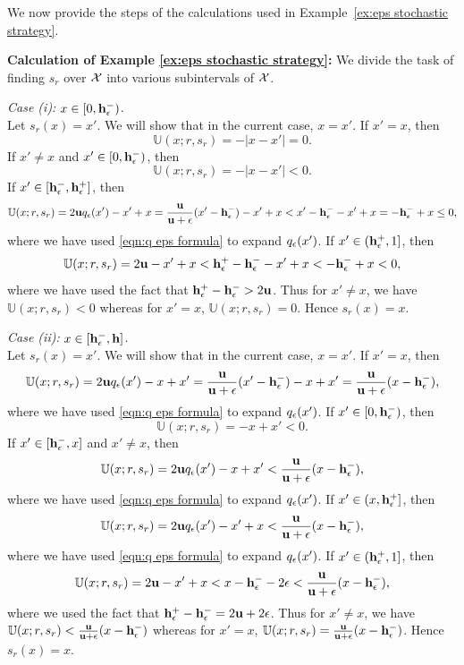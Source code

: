We now provide the steps of the calculations used in Example~\ref{ex:eps stochastic strategy}.

\noindent \textbf{Calculation of Example \ref{ex:eps stochastic strategy}:} \label{cal:eps stochastic strategy}
 We divide the task of finding $ s_r $ over $ \mathcal{X} $ into various subintervals of $ \mathcal{X} $.

\noindent \textit{Case (i):} $ x \in [0,\mathbf{h}_{\epsilon}^-) $.\\
    Let $s_r(x) = x'$. We will show that in the current case, $x=x'$.   
    If $x' = x$, then $$\mathbb{U}(x;r,s_r) = -|x-x'| = 0.$$ 
    If $x' \neq x$ and $x' \in [0,\mathbf{h}_{\epsilon}^-)$, then $$\mathbb{U}(x;r,s_r) = -|x-x'| < 0.$$
    If $x' \in [\mathbf{h}_{\epsilon}^-,\mathbf{h}_{\epsilon}^+]$, then $$\mathbb{U}(x;r,s_r) = 2\mathbf{u} q_{\epsilon}(x') - x' + x = \frac{\mathbf{u}}{\mathbf{u} + \epsilon}(x' - \mathbf{h}_{\epsilon}^-) - x' + x < x' - \mathbf{h}_{\epsilon}^- -x' + x = -\mathbf{h}_{\epsilon}^- + x \leq 0,$$ where we have used \eqref{eqn:q eps formula} to expand $q_{\epsilon}(x')$.
    If $x' \in (\mathbf{h}_{\epsilon}^+,1]$, then $$\mathbb{U}(x;r,s_r) = 2\mathbf{u} - x' + x < \mathbf{h}_{\epsilon}^+ - \mathbf{h}_{\epsilon}^- - x' + x < -\mathbf{h}_{\epsilon}^-  + x < 0,$$ where we have used the fact that $\mathbf{h}_{\epsilon}^+ - \mathbf{h}_{\epsilon}^- > 2\mathbf{u}$.
Thus for $x' \neq x$, we have $\mathbb{U}(x;r,s_r) < 0$ whereas for $x' = x$, $\mathbb{U}(x;r,s_r) = 0$. Hence $s_r(x) = x$. 
        


\noindent \textit{Case (ii):} $ x \in [\mathbf{h}_{\epsilon}^-,\mathbf{h}] $.\\
Let $s_r(x) = x'$. We will show that in the current case, $x=x'$. If $x'=x$, then 
\[\mathbb{U}(x;r,s_r) = 2\mathbf{u} q_{\epsilon}(x') - x + x' = \frac{\mathbf{u}}{\mathbf{u}+\epsilon}(x'-\mathbf{h}_{\epsilon}^-) -x +x' = \frac{\mathbf{u}}{\mathbf{u}+\epsilon}(x-\mathbf{h}_{\epsilon}^-),\] where we have used \eqref{eqn:q eps formula} to expand $q_{\epsilon}(x')$.    
If $x' \in [0,\mathbf{h}_{\epsilon}^-)$, then 
\[\mathbb{U}(x;r,s_r) = -x + x' < 0.\]
If $x' \in [\mathbf{h}_{\epsilon}^-,x]$ and $x' \neq x$, then
\[\mathbb{U}(x;r,s_r) = 2\mathbf{u} q_{\epsilon}(x') - x + x' <\frac{\mathbf{u}}{\mathbf{u} + \epsilon}(x- \mathbf{h}_{\epsilon}^-),\] where we have used \eqref{eqn:q eps formula} to expand $q_{\epsilon}(x')$.    
If $x' \in (x,\mathbf{h}_{\epsilon}^+]$, then
\[\mathbb{U}(x;r,s_r) = 2\mathbf{u} q_{\epsilon}(x') - x' + x <  \frac{\mathbf{u}}{\mathbf{u} + \epsilon}(x-\mathbf{h}_{\epsilon}^-),\] where we have used \eqref{eqn:q eps formula} to expand $q_{\epsilon}(x')$. If $x' \in (\mathbf{h}_{\epsilon}^+,1]$, then 
\[\mathbb{U}(x;r,s_r) = 2\mathbf{u} - x' + x < x - \mathbf{h}_{\epsilon}^- - 2\epsilon < \frac{\mathbf{u}}{\mathbf{u}+\epsilon}(x-\mathbf{h}_{\epsilon}^-),\] where we used the fact that $\mathbf{h}_{\epsilon}^+ - \mathbf{h}_{\epsilon}^- =  2\mathbf{u} + 2\epsilon$. 
Thus for $x' \neq x$, we have $\mathbb{U}(x;r,s_r) < \frac{\mathbf{u}}{\mathbf{u}+\epsilon}(x-\mathbf{h}_{\epsilon}^-)$ whereas for $x' = x$, $\mathbb{U}(x;r,s_r) =\frac{\mathbf{u}}{\mathbf{u}+\epsilon}(x - \mathbf{h}_{\epsilon}^-)$. Hence $s_r(x) = x$.


